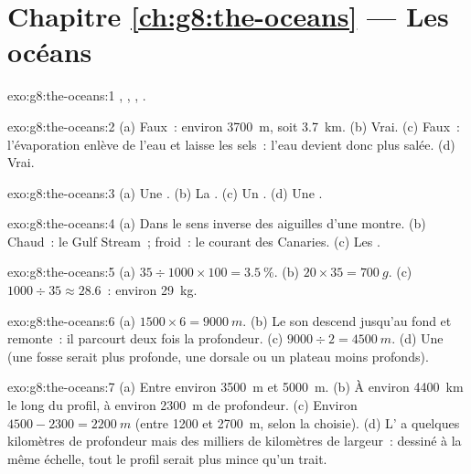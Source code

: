 \section*{Chapitre \ref{ch:g8:the-oceans} --- Les océans}

\begin{solution}{exo:g8:the-oceans:1}
, , , .
\end{solution}

\begin{solution}{exo:g8:the-oceans:2}
(a) Faux~: environ \qty{3700}{m}, soit \qty{3.7}{km}. (b) Vrai. (c)
Faux~: l'évaporation enlève de l'eau et laisse les sels~: l'eau devient
donc plus salée. (d) Vrai.
\end{solution}

\begin{solution}{exo:g8:the-oceans:3}
(a) Une . (b) La . (c) Un . (d) Une .
\end{solution}

\begin{solution}{exo:g8:the-oceans:4}
(a) Dans le sens inverse des aiguilles d'une montre. (b) Chaud~: le Gulf
Stream~; froid~: le courant des Canaries. (c) Les .
\end{solution}

\begin{solution}{exo:g8:the-oceans:5}
(a) $35 \div 1000 \times 100 = 3.5~\%$. (b) $20 \times 35 = \qty{700}{g}$.
(c) $1000 \div 35 \approx 28.6$~: environ \qty{29}{kg}.
\end{solution}

\begin{solution}{exo:g8:the-oceans:6}
(a) $1500 \times 6 = \qty{9000}{m}$. (b) Le son descend jusqu'au fond et
remonte~: il parcourt deux fois la profondeur. (c) $9000 \div 2 =
\qty{4500}{m}$. (d) Une  (une fosse serait plus profonde,
une dorsale ou un plateau moins profonds).
\end{solution}

\begin{solution}{exo:g8:the-oceans:7}
(a) Entre environ \qty{3500}{m} et \qty{5000}{m}. (b) À environ \qty{4400}{km} le long du profil, à environ \qty{2300}{m} de profondeur. (c) Environ
$4500 - 2300 = \qty{2200}{m}$ (entre 1200 et \qty{2700}{m}, selon la
 choisie). (d) L' a quelques kilomètres de profondeur mais des
milliers de kilomètres de largeur~: dessiné à la même échelle, tout le
profil serait plus mince qu'un trait.
\end{solution}

